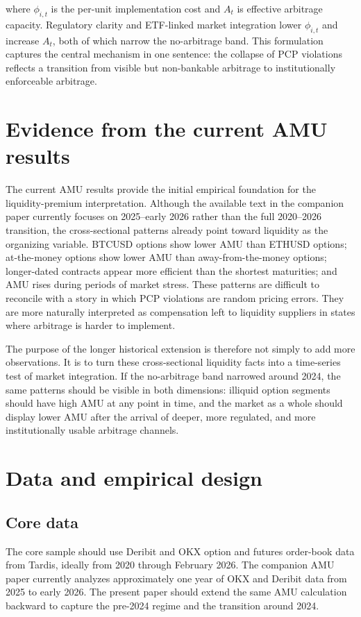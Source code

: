 \documentclass[12pt]{article}
\begin{document}
where $\phi_{i,t}$ is the per-unit implementation cost and $A_t$ is effective arbitrage capacity. Regulatory clarity and ETF-linked market integration lower $\phi_{i,t}$ and increase $A_t$, both of which narrow the no-arbitrage band. This formulation captures the central mechanism in one sentence: the collapse of PCP violations reflects a transition from visible but non-bankable arbitrage to institutionally enforceable arbitrage.

\section{Evidence from the current AMU results}

The current AMU results provide the initial empirical foundation for the liquidity-premium interpretation. Although the available text in the companion paper currently focuses on 2025--early 2026 rather than the full 2020--2026 transition, the cross-sectional patterns already point toward liquidity as the organizing variable. BTCUSD options show lower AMU than ETHUSD options; at-the-money options show lower AMU than away-from-the-money options; longer-dated contracts appear more efficient than the shortest maturities; and AMU rises during periods of market stress. These patterns are difficult to reconcile with a story in which PCP violations are random pricing errors. They are more naturally interpreted as compensation left to liquidity suppliers in states where arbitrage is harder to implement.

The purpose of the longer historical extension is therefore not simply to add more observations. It is to turn these cross-sectional liquidity facts into a time-series test of market integration. If the no-arbitrage band narrowed around 2024, the same patterns should be visible in both dimensions: illiquid option segments should have high AMU at any point in time, and the market as a whole should display lower AMU after the arrival of deeper, more regulated, and more institutionally usable arbitrage channels.

\section{Data and empirical design}

\subsection{Core data}

The core sample should use Deribit and OKX option and futures order-book data from Tardis, ideally from 2020 through February 2026. The companion AMU paper currently analyzes approximately one year of OKX and Deribit data from 2025 to early 2026. The present paper should extend the same AMU calculation backward to capture the pre-2024 regime and the transition around 2024.
\end{document}
